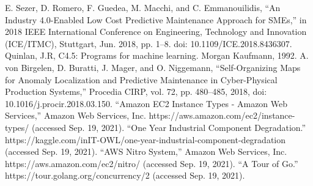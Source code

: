 \documentclass[conference]{IEEEtran}
\begin{document}
\begin{thebibliography}{00}
 E. Sezer, D. Romero, F. Guedea, M. Macchi, and C. Emmanouilidis, “An Industry 4.0-Enabled Low Cost Predictive Maintenance Approach for SMEs,” in 2018 IEEE International Conference on Engineering, Technology and Innovation (ICE/ITMC), Stuttgart, Jun. 2018, pp. 1–8. doi: 10.1109/ICE.2018.8436307.
 Quinlan, J.R, C4.5: Programs for machine learning. Morgan Kaufmann, 1992.
 A. von Birgelen, D. Buratti, J. Mager, and O. Niggemann, “Self-Organizing Maps for Anomaly Localization and Predictive Maintenance in Cyber-Physical Production Systems,” Procedia CIRP, vol. 72, pp. 480–485, 2018, doi: 10.1016/j.procir.2018.03.150.
 “Amazon EC2 Instance Types - Amazon Web Services,” Amazon Web Services, Inc. https://aws.amazon.com/ec2/instance-types/ (accessed Sep. 19, 2021).
 “One Year Industrial Component Degradation.” https://kaggle.com/inIT-OWL/one-year-industrial-component-degradation (accessed Sep. 19, 2021).
 “AWS Nitro System,” Amazon Web Services, Inc. https://aws.amazon.com/ec2/nitro/ (accessed Sep. 19, 2021).
 “A Tour of Go.” https://tour.golang.org/concurrency/2 (accessed Sep. 19, 2021).

\end{thebibliography}
\end{document}
